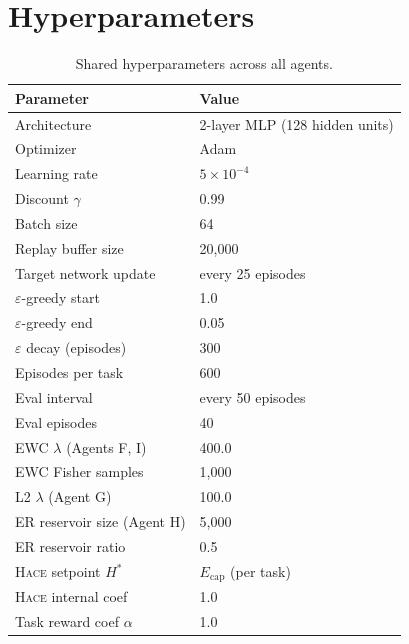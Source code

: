 \documentclass{article}
\newcommand{\setpoint}{H^*}
\newcommand{\energy}{E}
\newcommand{\hace}{\textsc{Hace}}
\begin{document}
\section*{Hyperparameters}
\label{app:hyperparams}

\begin{table}[h]
\centering
\caption{Shared hyperparameters across all agents.}
\small
\begin{tabular}{@{}ll@{}}
\toprule
\textbf{Parameter} & \textbf{Value} \\
\midrule
Architecture & 2-layer MLP (128 hidden units) \\
Optimizer & Adam \\
Learning rate & $5 \times 10^{-4}$ \\
Discount $\gamma$ & 0.99 \\
Batch size & 64 \\
Replay buffer size & 20{,}000 \\
Target network update & every 25 episodes \\
$\varepsilon$-greedy start & 1.0 \\
$\varepsilon$-greedy end & 0.05 \\
$\varepsilon$ decay (episodes) & 300 \\
Episodes per task & 600 \\
Eval interval & every 50 episodes \\
Eval episodes & 40 \\
\midrule
EWC $\lambda$ (Agents F, I) & 400.0 \\
EWC Fisher samples & 1{,}000 \\
L2 $\lambda$ (Agent G) & 100.0 \\
ER reservoir size (Agent H) & 5{,}000 \\
ER reservoir ratio & 0.5 \\
\hace{} setpoint $\setpoint$ & $\energy_{\mathrm{cap}}$ (per task) \\
\hace{} internal coef & 1.0 \\
Task reward coef $\alpha$ & 1.0 \\
\bottomrule
\end{tabular}
\end{table}
\end{document}

